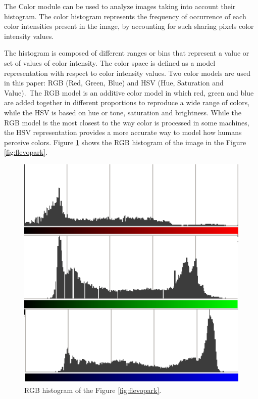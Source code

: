\documentclass[conference]{IEEEtran}
\begin{document}
The Color module can be used to analyze images taking into account their histogram. The color histogram represents the frequency of occurrence of each color intensities present in the image, by accounting for such sharing pixels color intensity values.

The histogram is composed of different ranges or bins that represent a value or set of values ​​of color intensity. The color space is defined as a model representation with respect to color intensity values. Two color models are used in this paper: RGB (Red, Green, Blue) and HSV (Hue, Saturation and Value). The RGB model is an additive color model in which red, green and blue are added together in different proportions to reproduce a wide range of colors, while the HSV is based on hue or tone, saturation and brightness. While the RGB model is the most closest to the way color is processed in some machines, the HSV representation provides a more accurate way to model how humans perceive colors.
Figure \ref{fig:histogram} shows the RGB histogram of the image in the Figure \ref{fig:flevopark}.

\begin{figure}
\centering
   \includegraphics[scale =0.6] {images/histogram.eps}
\caption{RGB histogram of the Figure \ref{fig:flevopark}. }
\label{fig:histogram}
\end{figure}
\end{document}
